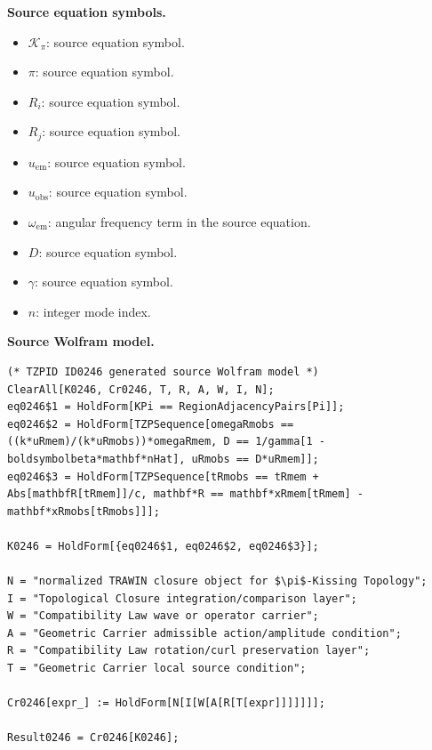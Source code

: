 \begin{minipage}[t]{0.49\linewidth}
\begingroup
\small
\raggedright
\textbf{Source equation symbols.}\par
\begin{itemize}[leftmargin=1.35em,itemsep=1pt,topsep=1pt,parsep=0pt]
    \item $\mathcal{K}_{\pi}$: source equation symbol.
    \item $\pi$: source equation symbol.
    \item $R_i$: source equation symbol.
    \item $R_j$: source equation symbol.
    \item $u_{\mathrm{em}}$: source equation symbol.
    \item $u_{\mathrm{obs}}$: source equation symbol.
    \item $\omega_{\mathrm{em}}$: angular frequency term in the source equation.
    \item $D$: source equation symbol.
    \item $\gamma$: source equation symbol.
    \item $n$: integer mode index.
\end{itemize}
\endgroup
\end{minipage}\hfill
\begin{minipage}[t]{0.47\linewidth}
\begingroup
\scriptsize
\raggedright
\textbf{Source Wolfram model.}\par
\begin{Verbatim}[fontsize=\tiny,breaklines=true,breakanywhere=true]
(* TZPID ID0246 generated source Wolfram model *)
ClearAll[K0246, Cr0246, T, R, A, W, I, N];
eq0246$1 = HoldForm[KPi == RegionAdjacencyPairs[Pi]];
eq0246$2 = HoldForm[TZPSequence[omegaRmobs == ((k*uRmem)/(k*uRmobs))*omegaRmem, D == 1/gamma[1 - boldsymbolbeta*mathbf*nHat], uRmobs == D*uRmem]];
eq0246$3 = HoldForm[TZPSequence[tRmobs == tRmem + Abs[mathbfR[tRmem]]/c, mathbf*R == mathbf*xRmem[tRmem] - mathbf*xRmobs[tRmobs]]];

K0246 = HoldForm[{eq0246$1, eq0246$2, eq0246$3}];

N = "normalized TRAWIN closure object for $\pi$-Kissing Topology";
I = "Topological Closure integration/comparison layer";
W = "Compatibility Law wave or operator carrier";
A = "Geometric Carrier admissible action/amplitude condition";
R = "Compatibility Law rotation/curl preservation layer";
T = "Geometric Carrier local source condition";

Cr0246[expr_] := HoldForm[N[I[W[A[R[T[expr]]]]]]];

Result0246 = Cr0246[K0246];
\end{Verbatim}
\endgroup
\end{minipage}

